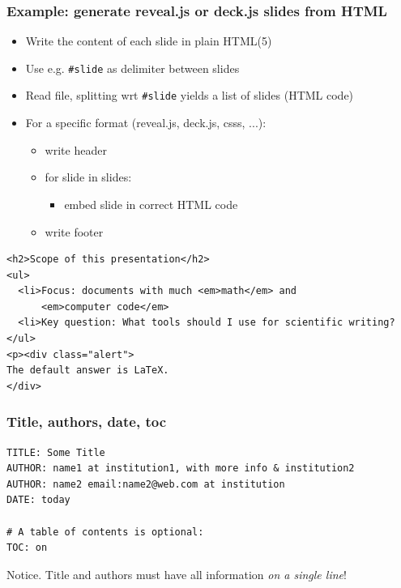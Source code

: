 \documentclass{beamer}
\newenvironment{graybox1admon}[1][]{\begin{block}{#1}}{\end{block}}
\begin{document}
\begin{frame}
\frametitle{Example: generate reveal.js or deck.js slides from HTML}

\begin{itemize}
 \item Write the content of each slide in plain HTML(5)

 \item Use e.g. \Verb!#slide! as delimiter between slides

 \item Read file, splitting wrt \Verb!#slide! yields a list of
   slides (HTML code)

 \item For a specific format (reveal.js, deck.js, csss, ...):
\begin{itemize}

    \item write header

    \item for slide in slides:
\begin{itemize}

      \item embed slide in correct HTML code

\end{itemize}

\noindent
    \item write footer
\end{itemize}

\noindent
\end{itemize}

\noindent
\begin{verbatim}
<h2>Scope of this presentation</h2>
<ul>
  <li>Focus: documents with much <em>math</em> and
      <em>computer code</em>
  <li>Key question: What tools should I use for scientific writing?
</ul>
<p><div class="alert">
The default answer is LaTeX.
</div>
\end{verbatim}
\end{frame}

\begin{frame}
\frametitle{Title, authors, date, toc}

\begin{Verbatim}[numbers=none,fontsize=\fontsize{9pt}{9pt},baselinestretch=0.95]
TITLE: Some Title
AUTHOR: name1 at institution1, with more info & institution2
AUTHOR: name2 email:name2@web.com at institution
DATE: today

# A table of contents is optional:
TOC: on
\end{Verbatim}


\begin{graybox1admon}[Notice.]
Title and authors must have all information \emph{on a single line}!
\end{graybox1admon}
\end{frame}
\end{document}
